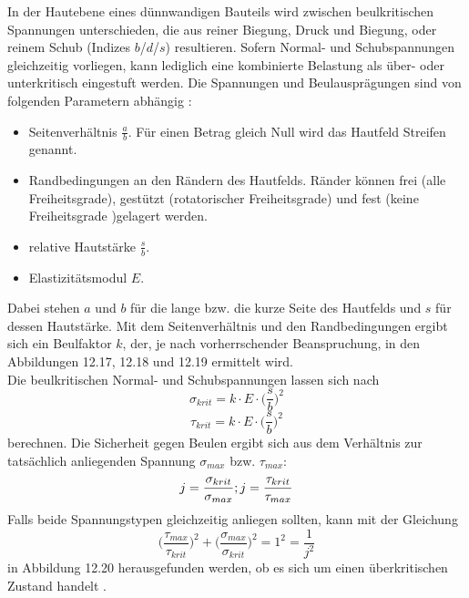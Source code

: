 \noindent In der Hautebene eines dünnwandigen Bauteils wird zwischen beulkritischen Spannungen unterschieden, die aus reiner Biegung, Druck und Biegung, oder reinem Schub (Indizes $b$/$d$/$s$) resultieren. Sofern Normal- und Schubspannungen gleichzeitig vorliegen, kann lediglich eine kombinierte Belastung als über- oder unterkritisch eingestuft werden. Die Spannungen und Beulausprägungen sind von folgenden Parametern abhängig \cite{item1}:
\begin{itemize}
	\item Seitenverhältnis $\frac{a}{b}$. Für einen Betrag gleich Null wird das Hautfeld \glqq Streifen\grqq\: genannt. 
	\item Randbedingungen an den Rändern des Hautfelds. Ränder können frei (alle Freiheitsgrade), gestützt (rotatorischer Freiheitsgrade) und fest (keine Freiheitsgrade )gelagert werden.
	\item relative Hautstärke $\frac{s}{b}$.
	\item Elastizitätsmodul $E$.
\end{itemize}
Dabei stehen $a$ und $b$ für die lange bzw. die kurze Seite des Hautfelds und $s$ für dessen Hautstärke. Mit dem Seitenverhältnis und den Randbedingungen ergibt sich ein Beulfaktor $k$, der, je nach vorherrschender Beanspruchung, in den Abbildungen 12.17, 12.18 und 12.19  ermittelt wird. \\
Die beulkritischen Normal- und Schubspannungen lassen sich nach
\begin{equation}
	\sigma_{krit}=k\cdot E\cdot\Big(\frac{s}{b}\Big)^{2}
\end{equation}
\begin{equation}
	\tau_{krit}=k\cdot E\cdot\Big(\frac{s}{b}\Big)^{2}
\end{equation}
berechnen. Die Sicherheit gegen Beulen ergibt sich aus dem Verhältnis zur tatsächlich anliegenden Spannung $\sigma_{max}$ bzw. $\tau_{max}$:
\begin{equation}
	j=\frac{\sigma_{krit}}{\sigma_{max}};\\
	j=\frac{\tau_{krit}}{\tau_{max}}
\end{equation}
Falls beide Spannungstypen gleichzeitig anliegen sollten, kann mit der Gleichung
\begin{equation}
	\Big(\frac{\tau_{max}}{\tau_{krit}}\Big)^{2}+\Big(\frac{\sigma_{max}}{\sigma_{krit}}\Big)^{2}=1^{2}=\frac{1}{j^{2}}
\end{equation}
in Abbildung 12.20 herausgefunden werden, ob es sich um einen überkritischen Zustand handelt \cite{item1}.\\

